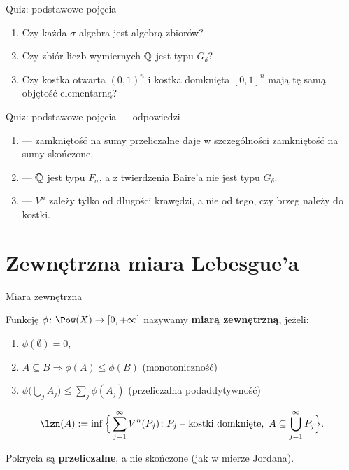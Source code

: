 \documentclass[aspectratio=169,11pt,t,envcountsect,professionalfonts]{beamer}
\begin{document}
\begin{frame}{Quiz: podstawowe pojęcia}
  \begin{enumerate}
    \item Czy każda $\sigma$-algebra jest algebrą zbiorów?
    \item Czy zbiór liczb wymiernych $\mathbb{Q}$ jest typu $G_\delta$?
    \item Czy kostka otwarta $(0,1)^n$ i kostka domknięta $[0,1]^n$ mają tę samą objętość elementarną?
  \end{enumerate}
\end{frame}

\begin{frame}{Quiz: podstawowe pojęcia --- odpowiedzi}
  \begin{enumerate}
    \item \TAK{} --- zamkniętość na sumy przeliczalne daje w szczególności zamkniętość na sumy skończone.
    \item \NIE{} --- $\mathbb{Q}$ jest typu $F_\sigma$, a z twierdzenia Baire'a nie jest typu $G_\delta$.
    \item \TAK{} --- $V^n$ zależy tylko od długości krawędzi, a nie od tego, czy brzeg należy do kostki.
  \end{enumerate}
\end{frame}

\section{Zewnętrzna miara Lebesgue'a}

\begin{frame}{Miara zewnętrzna}
  \begin{mydef}
    Funkcję $\phi\colon \Pow(X) \to [0, +\infty]$ nazywamy \textbf{miarą zewnętrzną}, jeżeli:
    \begin{enumerate}
      \item $\phi(\emptyset) = 0$,
      \item $A \subseteq B \Rightarrow \phi(A) \le \phi(B)$ \hfill (monotoniczność)
      \item $\phi\big(\bigcup_j A_j\big) \le \sum_j \phi(A_j)$ \hfill (przeliczalna podaddytywność)
    \end{enumerate}
  \end{mydef}

  \begin{mydef}
    \[
      \lzn(A) := \inf \Big\{ \sum_{j=1}^\infty V^n(P_j) \colon P_j \text{ -- kostki domknięte},\ A \subseteq \bigcup_{j=1}^\infty P_j \Big\}.
    \]
  \end{mydef}
  Pokrycia są \textbf{przeliczalne}, a nie skończone (jak w mierze Jordana).
\end{frame}
\end{document}
